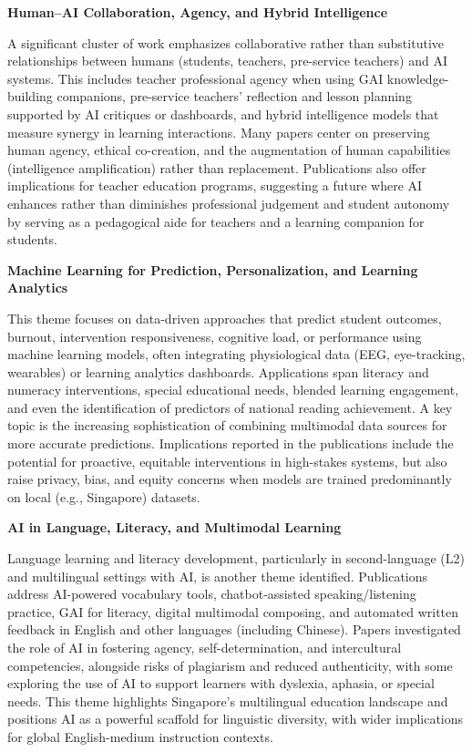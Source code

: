 \documentclass[english]{textolivre}
\begin{document}
\textbf{Human–AI Collaboration, Agency, and Hybrid Intelligence}

    A significant cluster of work emphasizes collaborative rather than substitutive relationships between humans (students, teachers, pre-service teachers) and AI systems. This includes teacher professional agency when using GAI knowledge-building companions, pre-service teachers’ reflection and lesson planning supported by AI critiques or dashboards, and hybrid intelligence models that measure synergy in learning interactions. Many papers center on preserving human agency, ethical co-creation, and the augmentation of human capabilities (intelligence amplification) rather than replacement. Publications also offer implications for teacher education programs, suggesting a future where AI enhances rather than diminishes professional judgement and student autonomy by serving as a pedagogical aide for teachers and a learning companion for students.

\textbf{Machine Learning for Prediction, Personalization, and Learning Analytics}

    This theme focuses on data-driven approaches that predict student outcomes, burnout, intervention responsiveness, cognitive load, or performance using machine learning models, often integrating physiological data (EEG, eye-tracking, wearables) or learning analytics dashboards. Applications span literacy and numeracy interventions, special educational needs, blended learning engagement, and even the identification of predictors of national reading achievement. A key topic is the increasing sophistication of combining multimodal data sources for more accurate predictions. Implications reported in the publications include the potential for proactive, equitable interventions in high-stakes systems, but also raise privacy, bias, and equity concerns when models are trained predominantly on local (e.g., Singapore) datasets.

\textbf{AI in Language, Literacy, and Multimodal Learning}

    Language learning and literacy development, particularly in second-language (L2) and multilingual settings with AI, is another theme identified. Publications address AI-powered vocabulary tools, chatbot-assisted speaking/listening practice, GAI for literacy, digital multimodal composing, and automated written feedback in English and other languages (including Chinese). Papers investigated the role of AI in fostering agency, self-determination, and intercultural competencies, alongside risks of plagiarism and reduced authenticity, with some exploring the use of AI to support learners with dyslexia, aphasia, or special needs. This theme highlights Singapore’s multilingual education landscape and positions AI as a powerful scaffold for linguistic diversity, with wider implications for global English-medium instruction contexts.
\end{document}
